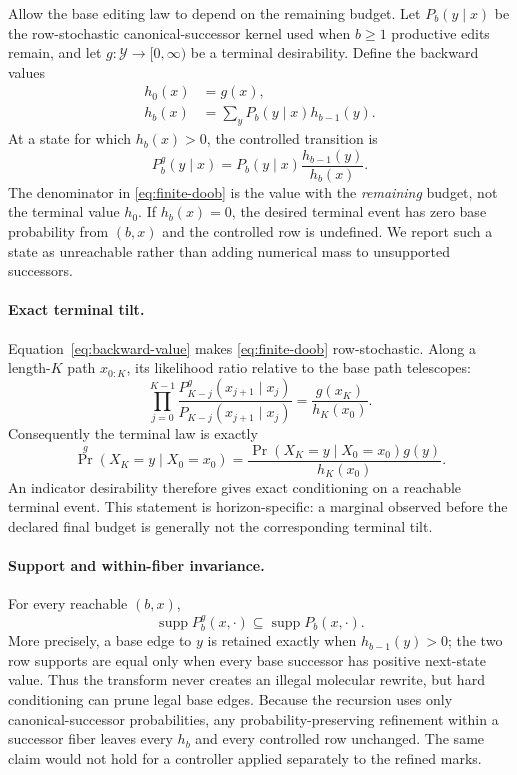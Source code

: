 \documentclass[10pt,letterpaper]{article}
\begin{document}
Allow the base editing law to depend on the remaining budget. Let
$P_b(y\mid x)$ be the row-stochastic canonical-successor kernel used when
$b\geq 1$ productive edits remain, and let $g:\mathcal Y\to[0,\infty)$ be a
terminal desirability. Define the backward values
\begin{align}
  h_0(x) &= g(x), \\
  h_b(x) &= \sum_y P_b(y\mid x)h_{b-1}(y).
  \label{eq:backward-value}
\end{align}
At a state for which $h_b(x)>0$, the controlled transition is
\begin{equation}
  P_b^g(y\mid x)
  =
  P_b(y\mid x)\frac{h_{b-1}(y)}{h_b(x)}.
  \label{eq:finite-doob}
\end{equation}
The denominator in \eqref{eq:finite-doob} is the value with the
\emph{remaining} budget, not the terminal value $h_0$. If $h_b(x)=0$, the
desired terminal event has zero base probability from $(b,x)$ and the
controlled row is undefined. We report such a state as unreachable rather
than adding numerical mass to unsupported successors.

\paragraph{Exact terminal tilt.}
Equation~\eqref{eq:backward-value} makes
\eqref{eq:finite-doob} row-stochastic. Along a length-$K$ path
$x_{0:K}$, its likelihood ratio relative to the base path telescopes:
\begin{equation}
  \prod_{j=0}^{K-1}
  \frac{
    P_{K-j}^g(x_{j+1}\mid x_j)
  }{
    P_{K-j}(x_{j+1}\mid x_j)
  }
  =
  \frac{g(x_K)}{h_K(x_0)}.
  \label{eq:path-telescope}
\end{equation}
Consequently the terminal law is exactly
\begin{equation}
  \Pr^g(X_K=y\mid X_0=x_0)
  =
  \frac{
    \Pr(X_K=y\mid X_0=x_0)g(y)
  }{
    h_K(x_0)
  }.
  \label{eq:terminal-tilt}
\end{equation}
An indicator desirability therefore gives exact conditioning on a reachable
terminal event. This statement is horizon-specific: a marginal observed
before the declared final budget is generally not the corresponding terminal
tilt.

\paragraph{Support and within-fiber invariance.}
For every reachable $(b,x)$,
\[
  \operatorname{supp}P_b^g(x,\cdot)
  \subseteq
  \operatorname{supp}P_b(x,\cdot).
\]
More precisely, a base edge to $y$ is retained exactly when
$h_{b-1}(y)>0$; the two row supports are equal only when every base successor
has positive next-state value. Thus the transform never creates an illegal
molecular rewrite, but hard conditioning can prune legal base edges. Because
the recursion uses only canonical-successor probabilities, any
probability-preserving refinement within a successor fiber leaves every
$h_b$ and every controlled row unchanged. The same claim would not hold for a
controller applied separately to the refined marks.
\end{document}
